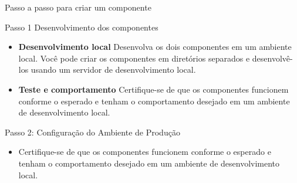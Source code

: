 \documentclass[13pt, xcolor={dvipsnames,svgnames}, portuguese]{beamer}
\begin{document}
\begin{frame}[fragile]{Passo a passo para criar um componente}
  \begin{block}{Passo 1 Desenvolvimento dos componentes}    
    \begin{itemize}
		\item[1] \textbf{Desenvolvimento local} Desenvolva os dois componentes em um ambiente local. Você pode criar os componentes em diretórios separados e desenvolvê-los usando um servidor de desenvolvimento local.	

		\item[2]\textbf{Teste e comportamento} Certifique-se de que os componentes funcionem conforme o esperado e tenham o comportamento desejado em um ambiente de desenvolvimento local.
	\end{itemize}
  \end{block}

  \begin{block}{Passo 2: Configuração do Ambiente de Produção}    
    \begin{itemize}
		\item[3] Certifique-se de que os componentes funcionem conforme o esperado e tenham o comportamento desejado em um ambiente de desenvolvimento local.
	\end{itemize}
  \end{block}

\end{frame}
\end{document}
